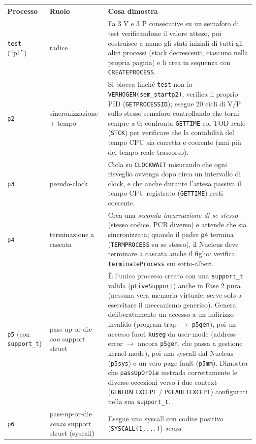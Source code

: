 \documentclass[11pt,a4paper]{article}
\newcommand{\code}[1]{\texttt{#1}}
\begin{document}
\begin{center}
\begin{longtable}{@{}llp{8.6cm}@{}}
\toprule
\textbf{Processo} & \textbf{Ruolo} & \textbf{Cosa dimostra} \\
\midrule
\code{test} (``p1'') & radice & Fa 3 V e 3 P consecutive su un semaforo di
  test verificandone il valore atteso, poi costruisce a mano gli stati
  iniziali di tutti gli altri processi (stack decrescenti, ciascuno nella
  propria pagina) e li crea in sequenza con \code{CREATEPROCESS}. \\
\code{p2} & sincronizzazione + tempo & Si blocca finché \code{test} non fa
  \code{VERHOGEN(sem\_startp2)}; verifica il proprio PID
  (\code{GETPROCESSID}); esegue 20 cicli di V/P sullo stesso semaforo
  controllando che torni sempre a 0; confronta \code{GETTIME} col TOD reale
  (\code{STCK}) per verificare che la contabilità del tempo CPU sia
  corretta e coerente (mai più del tempo reale trascorso). \\
\code{p3} & pseudo-clock & Cicla su \code{CLOCKWAIT} misurando che ogni
  risveglio avvenga dopo circa un intervallo di clock, e che anche
  durante l'attesa passiva il tempo CPU registrato (\code{GETTIME}) resti
  coerente. \\
\code{p4} & terminazione a cascata & Crea una \emph{seconda incarnazione di
  se stesso} (stesso codice, PCB diverso) e attende che sia sincronizzata;
  quando il padre \code{p4} termina (\code{TERMPROCESS} su se stesso), il
  Nucleus deve terminare a cascata anche il figlio: verifica
  \code{terminateProcess} sui sotto-alberi. \\
\code{p5} (con \code{support\_t}) & pass-up-or-die \emph{con} support
  struct & È l'unico processo creato con una \code{support\_t} valida
  (\code{pFiveSupport}) anche in Fase 2 pura (nessuna vera memoria
  virtuale: serve solo a esercitare il meccanismo generico). Genera
  deliberatamente un accesso a un indirizzo invalido (program trap $\to$
  \code{p5gen}), poi un accesso fuori \code{kuseg} da user-mode (address
  error $\to$ ancora \code{p5gen}, che passa a gestione kernel-mode), poi
  una syscall dal Nucleus (\code{p5sys}) e un vero page fault
  (\code{p5mm}). Dimostra che \code{passUpOrDie} instrada correttamente le
  diverse eccezioni verso i due context (\code{GENERALEXCEPT} /
  \code{PGFAULTEXCEPT}) configurati nella sua \code{support\_t}. \\
\code{p6} & pass-up-or-die \emph{senza} support struct (syscall) & Esegue
  una syscall con codice positivo (\code{SYSCALL(1,...)}) \emph{senza}

\end{longtable}
\end{center}
\end{document}
